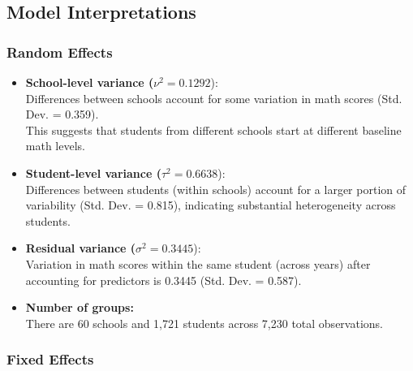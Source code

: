 \documentclass[
  letterpaper,
  DIV=11,
  numbers=noendperiod]{scrreprt}
\begin{document}
\hypertarget{model-interpretations}{%
\subsection*{Model Interpretations}\label{model-interpretations}}

\hypertarget{random-effects}{%
\subsubsection*{Random Effects}\label{random-effects}}

\begin{itemize}
\item
  \textbf{School-level variance (}\(\nu^2 = 0.1292\)):\\
  Differences between schools account for some variation in math scores
  (Std. Dev. = 0.359).\\
  This suggests that students from different schools start at different
  baseline math levels.
\item
  \textbf{Student-level variance (}\(\tau^2 = 0.6638\)):\\
  Differences between students (within schools) account for a larger
  portion of variability (Std. Dev. = 0.815), indicating substantial
  heterogeneity across students.
\item
  \textbf{Residual variance (}\(\sigma^2 = 0.3445\)):\\
  Variation in math scores within the same student (across years) after
  accounting for predictors is 0.3445 (Std. Dev. = 0.587).
\item
  \textbf{Number of groups:}\\
  There are 60 schools and 1,721 students across 7,230 total
  observations.
\end{itemize}

\hypertarget{fixed-effects}{%
\subsubsection*{Fixed Effects}\label{fixed-effects}}
\end{document}
